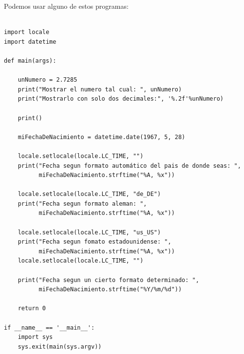 \documentclass[spanish,12pt,a4paper,final,oneside]{book}
\begin{document}
Podemos usar alguno de estos programas:

\begin{lstlisting}[frame=single, caption=lenguaje python]

import locale
import datetime

def main(args):
    
    unNumero = 2.7285
    print("Mostrar el numero tal cual: ", unNumero)
    print("Mostrarlo con solo dos decimales:", '%.2f'%unNumero)
    
    print()
    
    miFechaDeNacimiento = datetime.date(1967, 5, 28)

    locale.setlocale(locale.LC_TIME, "")
    print("Fecha segun formato automático del pais de donde seas: ", 
          miFechaDeNacimiento.strftime("%A, %x"))
          
    locale.setlocale(locale.LC_TIME, "de_DE")
    print("Fecha segun formato aleman: ",
          miFechaDeNacimiento.strftime("%A, %x"))
          
    locale.setlocale(locale.LC_TIME, "us_US")
    print("Fecha segun fomato estadounidense: ",
          miFechaDeNacimiento.strftime("%A, %x"))
    locale.setlocale(locale.LC_TIME, "")
    
    print("Fecha segun un cierto formato determinado: ",
          miFechaDeNacimiento.strftime("%Y/%m/%d"))
    
    return 0

if __name__ == '__main__':
    import sys
    sys.exit(main(sys.argv))
\end{lstlisting}
\end{document}
